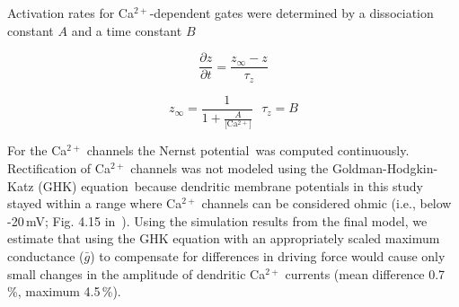 \documentclass[12pt]{article}
\begin{document}
Activation rates for Ca$^{2+}$-dependent gates were determined by a dissociation constant $A$ and a time constant $B$

\begin{equation}
   \frac{\partial z}{\partial t} = \frac{z_\infty - z}{\tau_z}
\end{equation}

\begin{equation}
   z_\infty = \frac{1}{1+\frac{A}{\mbox{[Ca$^{2+}$]}}} \mbox{        }\tau_z = B
\end{equation}

For the Ca$^{2+}$ channels the Nernst potential\,\cite{B:1991zr} was
computed continuously. Rectification of
Ca$^{2+}$ channels was not modeled using the Goldman-Hodgkin-Katz (GHK) equation\,\cite{B:1991zr}
because dendritic membrane potentials in this
study stayed within a range where Ca$^{2+}$  channels can be considered
ohmic (i.e., below -20\,mV; Fig. 4.15 in\,\cite{B:1991zr} ). Using
the simulation results from the final model, we estimate that using
the GHK equation with an appropriately scaled maximum conductance
($\bar g$) to compensate for differences in driving force would
cause only small changes in the amplitude of dendritic Ca$^{2+}$
currents (mean difference 0.7\,\%, maximum 4.5\,\%).



\end{document}
